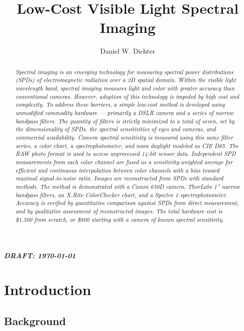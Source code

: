 \documentclass[twocolumn,10pt]{asme2ej}
\title{Low-Cost Visible Light Spectral Imaging}
\author{Daniel W. Dichter
    \affiliation{
Independent Researcher\\
Cambridge, Massachusetts, U.S.A.\\
daniel.w.dichter@gmail.com
    }	
}
\begin{document}
\maketitle

\color{red}
\emph{\textbf{DRAFT: \today}}\\
\color{black}

\begin{abstract}{\it Spectral imaging is an emerging technology for measuring spectral power distributions (SPDs) of electromagnetic radiation over a 2D spatial domain. Within the visible light wavelength band, spectral imaging measures light and color with greater accuracy than conventional cameras. However, adoption of this technology is impeded by high cost and complexity. To address these barriers, a simple low-cost method is developed using unmodified commodity hardware --- primarily a DSLR camera and a series of narrow bandpass filters. The quantity of filters is strictly minimized to a total of seven, set by the dimensionality of SPDs, the spectral sensitivities of eyes and cameras, and commercial availability. Camera spectral sensitivity is measured using this same filter series, a color chart, a spectrophotometer, and noon daylight modeled as CIE D65. The RAW photo format is used to access unprocessed 14-bit sensor data. Independent SPD measurements from each color channel are fused as a sensitivity-weighted average for efficient and continuous interpolation between color channels with a bias toward maximal signal-to-noise ratio. Images are reconstructed from SPDs with standard methods. The method is demonstrated with a Canon 650D camera, ThorLabs 1'' narrow bandpass filters, an X-Rite ColorChecker chart, and a Spectro 1 spectrophotometer. Accuracy is verified by quantitative comparison against SPDs from direct measurement, and by qualitative assessment of reconstructed images. The total hardware cost is \$1,500 from scratch, or \$800 starting with a camera of known spectral sensitivity.
}
\end{abstract}

\section{Introduction}

\subsection{Background}

\end{document}
